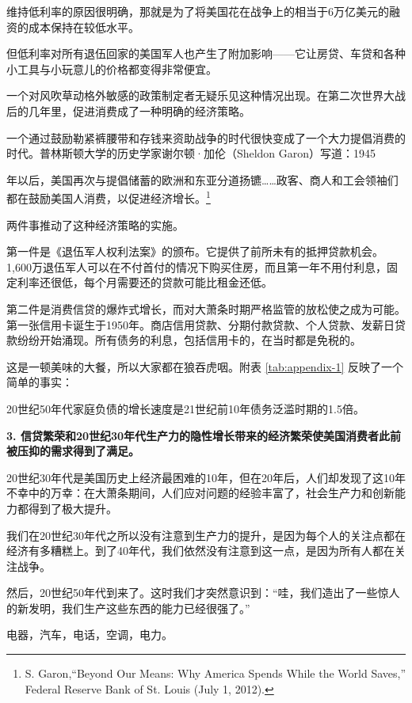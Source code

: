 维持低利率的原因很明确，那就是为了将美国花在战争上的相当于6万亿美元的融资的成本保持在较低水平。

但低利率对所有退伍回家的美国军人也产生了附加影响——它让房贷、车贷和各种小工具与小玩意儿的价格都变得非常便宜。

一个对风吹草动格外敏感的政策制定者无疑乐见这种情况出现。在第二次世界大战后的几年里，促进消费成了一种明确的经济策略。

一个通过鼓励勒紧裤腰带和存钱来资助战争的时代很快变成了一个大力提倡消费的时代。普林斯顿大学的历史学家谢尔顿·加伦（Sheldon Garon）写道：1945

{\kaishu

年以后，美国再次与提倡储蓄的欧洲和东亚分道扬镳……政客、商人和工会领袖们都在鼓励美国人消费，以促进经济增长。\footnote{S. Garon,“Beyond Our Means: Why America Spends While the World Saves,” Federal Reserve Bank of St. Louis (July 1, 2012).}

}

两件事推动了这种经济策略的实施。

第一件是《退伍军人权利法案》的颁布。它提供了前所未有的抵押贷款机会。1,600万退伍军人可以在不付首付的情况下购买住房，而且第一年不用付利息，固定利率还很低，每个月需要还的贷款可能比租金还低。

第二件是消费信贷的爆炸式增长，而对大萧条时期严格监管的放松使之成为可能。第一张信用卡诞生于1950年。商店信用贷款、分期付款贷款、个人贷款、发薪日贷款纷纷开始涌现。所有债务的利息，包括信用卡的，在当时都是免税的。

这是一顿美味的大餐，所以大家都在狼吞虎咽。附表 \ref{tab:appendix-1} 反映了一个简单的事实：



20世纪50年代家庭负债的增长速度是21世纪前10年债务泛滥时期的1.5倍。

\textbf{3. 信贷繁荣和20世纪30年代生产力的隐性增长带来的经济繁荣使美国消费者此前被压抑的需求得到了满足。}

20世纪30年代是美国历史上经济最困难的10年，但在20年后，人们却发现了这10年不幸中的万幸：在大萧条期间，人们应对问题的经验丰富了，社会生产力和创新能力都得到了极大提升。

我们在20世纪30年代之所以没有注意到生产力的提升，是因为每个人的关注点都在经济有多糟糕上。到了40年代，我们依然没有注意到这一点，是因为所有人都在关注战争。

然后，20世纪50年代到来了。这时我们才突然意识到：“哇，我们造出了一些惊人的新发明，我们生产这些东西的能力已经很强了。”

电器，汽车，电话，空调，电力。

